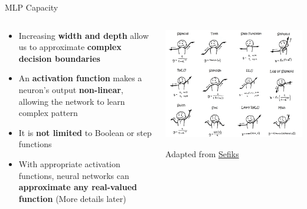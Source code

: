 \documentclass[serif, aspectratio=169]{beamer}
\begin{document}
\begin{frame}{MLP Capacity}
    \begin{columns}
        \begin{column}{0.6\textwidth}
            \begin{itemize}
                \item Increasing \textbf{width and depth} allow us to approximate \textbf{complex decision boundaries}
                \item An \textbf{activation function} makes a neuron’s output \textbf{non-linear}, allowing the network to learn complex pattern
                \item It is \textbf{not limited} to Boolean or step functions
                \item With appropriate activation functions, neural networks can \textbf{approximate any real-valued function} (More details later)
            \end{itemize}
        \end{column}
        \begin{column}{0.4\textwidth}
            \includegraphics[width=\textwidth]{pic/2/activations.png} \\
            \begin{center}
            {\scriptsize Adapted from \href{https://sefiks.com/2020/02/02/dance-moves-of-deep-learning-activation-functions/}{Sefiks}}
            \end{center}
        \end{column}
    \end{columns}
\end{frame}
\end{document}
